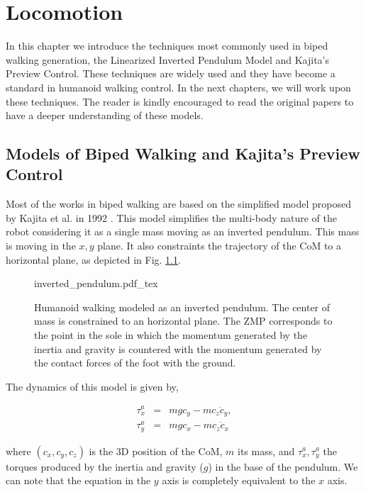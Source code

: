 
\chapter{Locomotion} 
\label{Chap:Locomotion-Control}

In this chapter we introduce the techniques most commonly used in biped walking generation, the Linearized Inverted Pendulum Model and Kajita's Preview Control. These techniques are widely used and they have become a standard in humanoid walking control. In the next chapters, we will work upon these techniques. The reader is kindly encouraged to read the original papers to have a deeper understanding of these models.


\section{Models of Biped Walking and Kajita's Preview Control}
Most of the works in biped walking are based on the simplified model proposed by Kajita et al. in 1992 \citep{Kajita1992}. This model simplifies the multi-body nature of the robot considering it as a single mass moving as an inverted pendulum. This mass is moving in the $x,y$ plane. It also constraints the trajectory of the CoM to a horizontal plane, as depicted in Fig. \ref{Fig:Inverted-Pendulum}.

\begin{figure}
  \centering
      {\def\svgwidth{1.0\columnwidth}
        
                   {inverted_pendulum.pdf_tex}}
      \caption[]{Humanoid walking modeled as an inverted pendulum. The center of mass is constrained to an horizontal plane. The ZMP corresponds to the point in the sole in which the momentum generated by the inertia and gravity is countered with the momentum generated by the contact forces of the foot with the ground.}
      \label{Fig:Inverted-Pendulum}
\end{figure}

The dynamics of this model is given by,

\begin{eqnarray}
\label{Eq:LIPM_dynamics}
\tau^a_x &=& mgc_y - mc_z \ddot{c}_y, \\
\tau^a_y &=& mgc_x - mc_z \ddot{c}_x
\end{eqnarray}

where $(c_x, c_y, c_z)$ is the 3D position of the CoM, $m$ its mass, and $\tau^a_x, \tau^a_y$ the torques produced by the inertia and gravity ($g$) in the base of the pendulum. We can note that the equation in the $y$ axis is completely equivalent to the $x$ axis.

